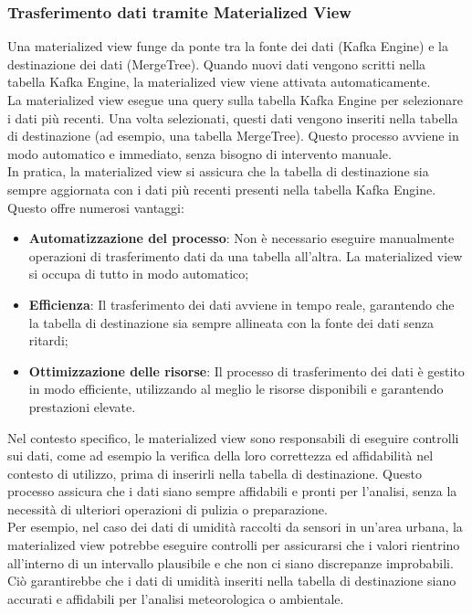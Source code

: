 \subsubsection{Trasferimento dati tramite Materialized View} \label{sec:materializedView}
Una materialized view funge da ponte tra la fonte dei dati (Kafka Engine) e la destinazione dei dati (MergeTree). Quando nuovi dati vengono scritti nella tabella Kafka Engine, la materialized view viene attivata automaticamente.\\
La materialized view esegue una query sulla tabella Kafka Engine per selezionare i dati più recenti. Una volta selezionati, questi dati vengono inseriti nella tabella di destinazione (ad esempio, una tabella MergeTree). Questo processo avviene in modo automatico e immediato, senza bisogno di intervento manuale.\\
In pratica, la materialized view si assicura che la tabella di destinazione sia sempre aggiornata con i dati più recenti presenti nella tabella Kafka Engine. Questo offre numerosi vantaggi:
\begin{itemize}
  \item \textbf{Automatizzazione del processo}: Non è necessario eseguire manualmente operazioni di trasferimento dati da una tabella all'altra. La materialized view si occupa di tutto in modo automatico;
  \item \textbf{Efficienza}: Il trasferimento dei dati avviene in tempo reale, garantendo che la tabella di destinazione sia sempre allineata con la fonte dei dati senza ritardi;
  \item \textbf{Ottimizzazione delle risorse}: Il processo di trasferimento dei dati è gestito in modo efficiente, utilizzando al meglio le risorse disponibili e garantendo prestazioni elevate.
\end{itemize}
Nel contesto specifico, le materialized view sono responsabili di eseguire controlli sui dati, come ad esempio la verifica della loro correttezza ed affidabilità nel contesto di utilizzo, prima di inserirli nella tabella di destinazione. Questo processo assicura che i dati siano sempre affidabili e pronti per l'analisi, senza la necessità di ulteriori operazioni di pulizia o preparazione.\\
Per esempio, nel caso dei dati di umidità raccolti da sensori in un'area urbana, la materialized view potrebbe eseguire controlli per assicurarsi che i valori rientrino all'interno di un intervallo plausibile e che non ci siano discrepanze improbabili. Ciò garantirebbe che i dati di umidità inseriti nella tabella di destinazione siano accurati e affidabili per l'analisi meteorologica o ambientale.


